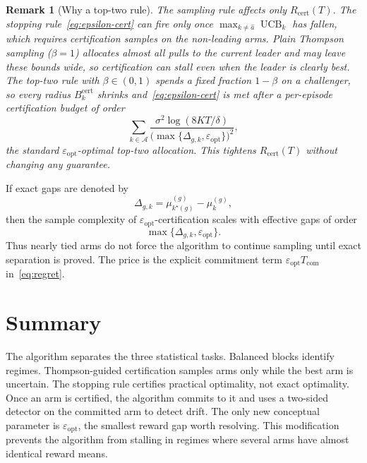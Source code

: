 \documentclass[11pt]{article}
\newtheorem{remark}{Remark}
\newcommand{\A}{\mathcal A}
\newcommand{\UCB}{\operatorname{UCB}}
\begin{document}
\begin{remark}[Why a top-two rule]
\label{rem:toptwo}
The sampling rule affects only $R_{\mathrm{cert}}(T)$. The stopping rule~\eqref{eq:epsilon-cert} can fire only once $\max_{k\neq\widehat a}\UCB_k$ has fallen, which requires certification samples on the \emph{non-leading} arms. Plain Thompson sampling ($\beta=1$) allocates almost all pulls to the current leader and may leave these bounds wide, so certification can stall even when the leader is clearly best. The top-two rule with $\beta\in(0,1)$ spends a fixed fraction $1-\beta$ on a challenger, so every radius $B_{k}^{\mathrm{cert}}$ shrinks and~\eqref{eq:epsilon-cert} is met after a per-episode certification budget of order
\begin{equation}
    \sum_{k\in\A}
    \frac{\sigma^2\log(8KT/\delta)}
    {\big(\max\{\Delta_{g,k},\varepsilon_{\mathrm{opt}}\}\big)^2},
    \label{eq:cert-budget}
\end{equation}
the standard $\varepsilon_{\mathrm{opt}}$-optimal top-two allocation. This tightens $R_{\mathrm{cert}}(T)$ without changing any guarantee.
\end{remark}

If exact gaps are denoted by
\begin{equation}
    \Delta_{g,k}=\mu_{k^\star(g)}^{(g)}-\mu_k^{(g)},
\end{equation}
then the sample complexity of $\varepsilon_{\mathrm{opt}}$-certification scales with effective gaps of order
\begin{equation}
    \max\{\Delta_{g,k},\varepsilon_{\mathrm{opt}}\}.
\end{equation}
Thus nearly tied arms do not force the algorithm to continue sampling until exact separation is proved. The price is the explicit commitment term $\varepsilon_{\mathrm{opt}}T_{\mathrm{com}}$ in~\eqref{eq:regret}.

\section{Summary}

The algorithm separates the three statistical tasks. Balanced blocks identify regimes. Thompson-guided certification samples arms only while the best arm is uncertain. The stopping rule certifies practical optimality, not exact optimality. Once an arm is certified, the algorithm commits to it and uses a two-sided detector on the committed arm to detect drift. The only new conceptual parameter is $\varepsilon_{\mathrm{opt}}$, the smallest reward gap worth resolving. This modification prevents the algorithm from stalling in regimes where several arms have almost identical reward means.
\end{document}
